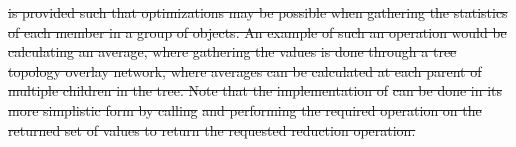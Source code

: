 \documentclass[12pt]{report} %
\providecommand{\DIFdeltex}[1]{{\protect\color{red}\sout{#1}}}                      %
\providecommand{\DIFdel}[1]{\texorpdfstring{\DIFdeltex{#1}}{}} %
\begin{document}

\DIFdel{is provided such that optimizations may be possible when gathering the statistics of each member in a group of objects.  
An example of such an operation would be calculating an average, where gathering the values is done through a tree topology overlay network, where averages can be calculated at each parent of multiple children in the tree.
Note that the implementation of }%
\DIFdel{can be done in its more simplistic form by calling }%
\DIFdel{and performing the required operation on the returned set of values to return the requested reduction operation.
}%
\end{document}
